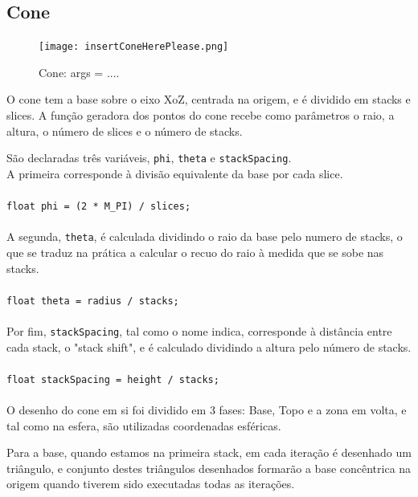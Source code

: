 \documentclass[a4paper]{article}
\begin{document}
\subsection{Cone}

\begin{figure}[H]
\centering
\texttt{[image: insertConeHerePlease.png]}
\caption{Cone: args = ....}
\end{figure}

O cone tem a base sobre o eixo XoZ, centrada na origem, e é dividido em stacks e slices. A função geradora dos pontos do cone recebe como parâmetros o raio, a altura, o número de slices e o número de stacks.

São declaradas três variáveis, \texttt{phi}, \texttt{theta} e \texttt{stackSpacing}.
\\

A primeira corresponde à divisão equivalente da base por cada slice.
\\
\\


\texttt{float phi = (2 * M\_PI) / slices;}\\
\\

A segunda, \texttt{theta}, é calculada dividindo o raio da base pelo numero de stacks, o que se traduz na prática a calcular o recuo do raio à medida que se sobe nas stacks.
\\
\\

\texttt{float theta = radius / stacks;}\\
\\

Por fim, \texttt{stackSpacing}, tal como o nome indica, corresponde à distância entre cada stack, o "stack shift", e é calculado dividindo a altura pelo número de stacks.\\
\\


\texttt{float stackSpacing = height / stacks;}\\
\\

O desenho do cone em si foi dividido em 3 fases: Base, Topo e a zona em volta, e tal como na esfera, são utilizadas coordenadas esféricas.

Para a base, quando estamos na primeira stack, em cada iteração é desenhado um triângulo, e conjunto destes triângulos desenhados formarão a base concêntrica na origem quando tiverem sido executadas todas as iterações.
\end{document}
